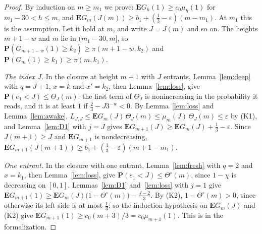 \documentclass[11pt]{amsart}
\theoremstyle{definition}
\numberwithin{equation}{section}
\newcommand{\E}{\mathbf{E}}
\renewcommand{\P}{\mathbf{P}}
\newcommand{\eps}{\varepsilon}
\begin{document}
\begin{proof}
By induction on $m\ge m_1$ we prove: $\E G_h(1)\ge c_0\mu_h(1)$ for $m_1-30<h\le m$, and $\E G_m(J(m))\ge b_1+(\frac13-\eps)(m-m_1)$. At $m_1$ this is the assumption. Let it hold at $m$, and write $J=J(m)$ and so on. The heights $m+1-w$ and $m$ lie in $(m_1-30,m]$, so $\P(G_{m+1-w}(1)\ge k_2)\ge\pi(m+1-w,k_2)$ and $\P(G_m(1)\ge k_1)\ge\pi(m,k_1)$.

\emph{The index $J$.} In the closure at height $m+1$ with $J$ entrants, Lemma~\ref{lem:deep} with $q=J+1$, $x=k$ and $x'=k_2$, then Lemma~\ref{lem:loss}, give $\P(e_1<J)\le \Theta_J(m)$: the first term of $\Theta_J$ is nonincreasing in the probability it reads, and it is at least $1$ if $\frac23-J3^{-w}<0$. By Lemma~\ref{lem:loss} and Lemma~\ref{lem:awake}, $L_{J,J}\le\E G_m(J)\,\Theta_J(m)\le\mu_m(J)\,\Theta_J(m)\le\eps$ by (K1), and Lemma~\ref{lem:D1} with $j=J$ gives $\E G_{m+1}(J)\ge\E G_m(J)+\frac13-\eps$. Since $J(m+1)\ge J$ and $\E G_{m+1}$ is nondecreasing, $\E G_{m+1}(J(m+1))\ge b_1+(\frac13-\eps)(m+1-m_1)$.

\emph{One entrant.} In the closure with one entrant, Lemma~\ref{lem:fresh} with $q=2$ and $x=k_1$, then Lemma~\ref{lem:loss}, give $\P(e_1<J)\le \Theta^\circ(m)$, since $1-\chi$ is decreasing on $[0,1]$. Lemmas~\ref{lem:D1} and~\ref{lem:loss} with $j=1$ give $\E G_{m+1}(1)\ge\E G_m(J)\bigl(1-\Theta^\circ(m)\bigr)-\frac{J-2}3$. By (K2), $1-\Theta^\circ(m)>0$, since otherwise its left side is at most $\frac13$; so the induction hypothesis on $\E G_m(J)$ and (K2) give $\E G_{m+1}(1)\ge c_0(m+3)/3=c_0\mu_{m+1}(1)$. This is  in the formalization.
\end{proof}
\end{document}
